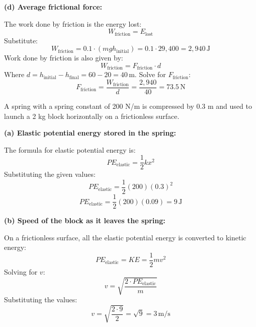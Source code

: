 \documentclass[addpoints]{exam}
\begin{document}
\begin{questions}
\begin{solution}[8cm]
    \textbf{(d) Average frictional force:}  

    The work done by friction is the energy lost:  
    \[
    W_\text{friction} = E_\text{lost}
    \]  
    Substitute:  
    \[
    W_\text{friction} = 0.1 \cdot (m g h_\text{initial}) = 0.1 \cdot 29,400 = 2,940 \, \text{J}
    \]  
    Work done by friction is also given by:  
    \[
    W_\text{friction} = F_\text{friction} \cdot d
    \]  
    Where \( d = h_\text{initial} - h_\text{final} = 60 - 20 = 40 \, \text{m} \).  
    Solve for \( F_\text{friction} \):  
    \[
    F_\text{friction} = \frac{W_\text{friction}}{d} = \frac{2,940}{40} = 73.5 \, \text{N}
    \]
\end{solution}
\vspace{8mm}



\question A spring with a spring constant of 200 N/m is compressed by 0.3 m and used to launch a 2 kg block horizontally on a frictionless surface.
\begin{solution}[6cm]
\textbf{(a) Elastic potential energy stored in the spring:}

    The formula for elastic potential energy is:
    \[
    PE_\text{elastic} = \frac{1}{2} k x^2
    \]
    Substituting the given values:
    \[
    PE_\text{elastic} = \frac{1}{2} (200) (0.3)^2
    \]
    \[
    PE_\text{elastic} = \frac{1}{2} (200) (0.09) = 9 \, \text{J}
    \]

    \textbf{(b) Speed of the block as it leaves the spring:}

    On a frictionless surface, all the elastic potential energy is converted to kinetic energy:
    \[
    PE_\text{elastic} = KE = \frac{1}{2} m v^2
    \]
    Solving for \(v\):
    \[
    v = \sqrt{\frac{2 \cdot PE_\text{elastic}}{m}}
    \]
    Substituting the values:
    \[
    v = \sqrt{\frac{2 \cdot 9}{2}} = \sqrt{9} = 3 \, \text{m/s}
    \]
\end{solution}





\end{questions}
\end{document}
